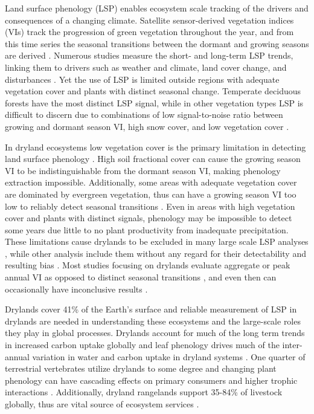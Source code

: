 \documentclass{article}
\begin{document}
Land surface phenology (LSP) enables ecosystem scale tracking of the drivers and consequences of a changing climate. Satellite sensor-derived vegetation indices (VIs) track the progression of green vegetation throughout the year, and from this time series the seasonal transitions between the dormant and growing seasons are derived \cite{zhang-liu2018, friedl2006, jonsson2004, sakamoto2010, gao2017, gray2019, bolton2020, zeng-wardlow2020}. Numerous studies measure the short- and long-term LSP trends, linking them to drivers such as weather and climate, land cover change, and disturbances \cite{piao-wang2020}. Yet the use of LSP is limited outside regions with adequate vegetation cover and plants with distinct seasonal change. Temperate deciduous forests have the most distinct LSP signal, while in other vegetation types LSP is difficult to discern due to combinations of low signal-to-noise ratio between growing and dormant season VI, high snow cover, and low vegetation cover \cite{richardson2018b, white2009}. 

In dryland ecosystems low vegetation cover is the primary limitation in detecting land surface phenology \cite{ma2013}. High soil fractional cover can cause the growing season VI to be indistinguishable from the dormant season VI, making phenology extraction impossible. Additionally, some areas with adequate vegetation cover are dominated by evergreen vegetation, thus can have a growing season VI too low to reliably detect seasonal transitions \cite{walker2015}. Even in areas with high vegetation cover and plants with distinct signals, phenology may be impossible to detect some years due little to no plant productivity from inadequate precipitation. These limitations cause drylands to be excluded in many large scale LSP analyses \cite{jeong2011, zhu2012, shen-zhang2014, xin-broich2015, garonna2016}, while other analysis include them without any regard for their detectability and resulting bias \cite{buitenwerf2015, VanLeeuwen2010}. Most studies focusing on drylands evaluate aggregate or peak annual VI as opposed to distinct seasonal transitions \cite{walker2015, hou-du2019}, and even then can occasionally have inconclusive results \cite{fensholt2012, andela2013}.

Drylands cover 41\% of the Earth’s surface \cite{hoover2020} and reliable measurement of LSP in drylands are needed in understanding these ecosystems and the large-scale roles they play in global processes. Drylands account for much of the long term trends in increased carbon uptake globally \cite{ahlstrom2015} and leaf phenology drives much of the inter-annual variation in water and carbon uptake in dryland systems \cite{whitley2017, renwick2019}. One quarter of terrestrial vertebrates utilize drylands to some degree \cite{safriel2005} and changing plant phenology can have cascading effects on primary consumers and higher trophic interactions \cite{aiken2017}. Additionally, dryland rangelands support 35-84\% of livestock globally, thus are vital source of ecosystem services \cite{chapin1996}.
\end{document}
